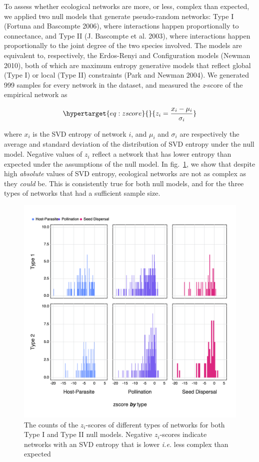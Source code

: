 \documentclass[11pt]{article}
\makeatletter
\def\maxwidth{\ifdim\Gin@nat@width>\linewidth\linewidth
\else\Gin@nat@width\fi}
\let\Oldincludegraphics\includegraphics
\renewcommand{\includegraphics}[1]{\Oldincludegraphics[width=\maxwidth]{#1}}
\makeatother
\begin{document}
To assess whether ecological networks are more, or less, complex than
expected, we applied two null models that generate pseudo-random
networks: Type I (Fortuna and Bascompte 2006), where interactions happen
proportionally to connectance, and Type II (J. Bascompte et al. 2003),
where interactions happen proportionally to the joint degree of the two
species involved. The models are equivalent to, respectively, the
Erdos-Renyi and Configuration models (Newman 2010), both of which are
maximum entropy generative models that reflect global (Type I) or local
(Type II) constraints (Park and Newman 2004). We generated 999 samples
for every network in the dataset, and measured the \emph{z}-score of the
empirical network as

\begin{equation}\protect\hypertarget{eq:zscore}{}{z_i = \frac{x_i-\mu_i}{\sigma_i}}\label{eq:zscore}\end{equation}

where \(x_i\) is the SVD entropy of network \(i\), and \(\mu_i\) and
\(\sigma_i\) are respectively the average and standard deviation of the
distribution of SVD entropy under the null model. Negative values of
\(z_i\) reflect a network that has lower entropy than expected under the
assumptions of the null model. In fig.~\ref{fig:nullmod}, we show that
despite high \emph{absolute} values of SVD entropy, ecological networks
are not as complex as they \emph{could} be. This is consistently true
for both null models, and for the three types of networks that had a
sufficient sample size.

\begin{figure}
\hypertarget{fig:nullmod}{%
\centering
\includegraphics{figures/nullmodel_histogram.png}
\caption{The counts of the \(z_i\)-scores of different types of networks
for both Type I and Type II null models. Negative \(z_i\)-scores
indicate networks with an SVD entropy that is lower \emph{i.e.} less
complex than expected}\label{fig:nullmod}
}
\end{figure}
\end{document}
